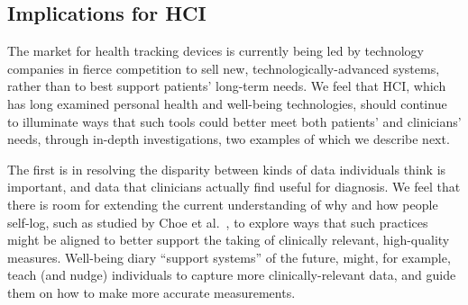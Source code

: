 \documentclass{sigchi}
\begin{document}


\subsection{Implications for HCI}


The market for health tracking devices is currently being led by technology companies in fierce competition to sell new, technologically-advanced systems, rather than to best support patients' long-term needs. We feel that HCI, which has long examined personal health and well-being technologies, should continue to illuminate ways that such tools could better meet both patients' and clinicians' needs, through in-depth investigations, two examples of which we describe next.

The first is in resolving the disparity between kinds of data individuals think is important, and data that clinicians actually find useful for diagnosis.  We feel that there is room for extending the current understanding of why and how people self-log, such as studied by Choe et al.~\cite{Choe2014}, to explore ways that such practices might be aligned to better support the taking of clinically relevant, high-quality measures.  Well-being diary ``support systems'' of the future, might, for example, teach (and nudge) individuals to capture more clinically-relevant data, and guide them on how to make more accurate measurements. 
\end{document}
